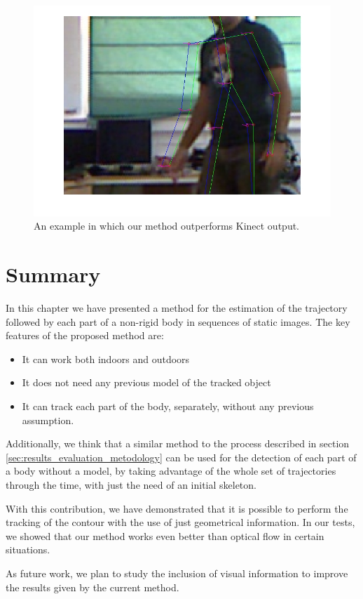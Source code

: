 \begin{figure}[h]
  \centering
  \includegraphics[width=0.5\columnwidth, trim=0 0 0 0,clip]{fig34.jpg}
  \caption{An example in which our method outperforms Kinect output.}
  \label{fig:cp02_comparison_kinect_fails}
\end{figure}


\section{Summary}\label{ch:chapter02_03}

In this chapter we have presented a method for the estimation of the trajectory followed by each part of a non-rigid body in sequences of static images. The key features of the proposed method are:
\begin{itemize}
 \item It can work both indoors and outdoors
 \item It does not need any previous model of the tracked object
 \item It can track each part of the body, separately, without any previous assumption.
\end{itemize}

Additionally, we think that a similar method to the process described in section \ref{sec:results_evaluation_metodology} can be used for the detection of each part of a body without a model, by taking advantage of the whole set of trajectories through the time, with just the need of an initial skeleton.

With this contribution, we have demonstrated that it is possible to perform the tracking of the contour with the use of just geometrical information. In our tests, we showed that our method works even better than optical flow in certain situations. 

As future work, we plan to study the inclusion of visual information to improve the results given by the current method.

